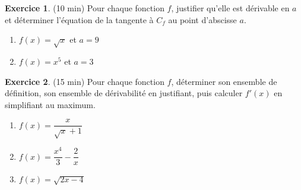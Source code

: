 \documentclass{exam}
\theoremstyle{definition}
\newtheorem{exercice}{Exercice}
\begin{document}
\begin{exercice}{(10 min)}
    Pour chaque fonction $f$, justifier qu’elle est dérivable en $a$ et déterminer l’équation de la tangente à $C_f$ au point d’abscisse $a$.
    \begin{enumerate}
        \item $f(x) = \sqrt{x}$ et $a = 9$
        \item $f(x) = x^5$ et $a = 3$
    \end{enumerate}
    \end{exercice}
    
    \begin{exercice}{(15 min)}
    Pour chaque fonction $f$, déterminer son ensemble de définition, son ensemble de dérivabilité en justifiant, puis calculer $f'(x)$ en simplifiant au maximum.
    \begin{enumerate}
        \item $f(x) = \dfrac{x}{\sqrt{x} + 1}$
        \item $f(x) = \dfrac{x^4}{3} - \dfrac{2}{x}$
        \item $f(x) = \sqrt{2x - 4}$
    \end{enumerate}
    \end{exercice}
    
\end{document}

